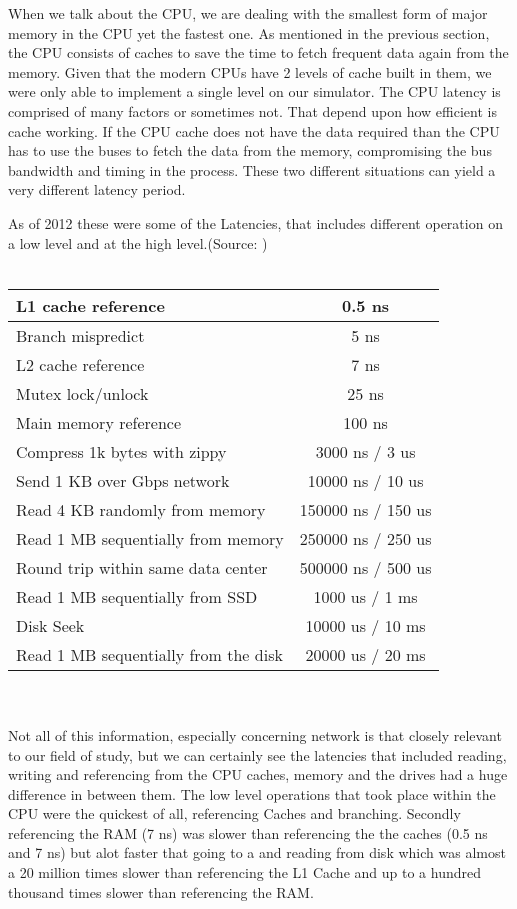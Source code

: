 \documentclass[12pt]{article}
\begin{document}
When we talk about the CPU, we are dealing with the smallest form of major memory in the CPU yet the fastest one.
As mentioned in the previous section, the CPU consists of caches to save the time to fetch frequent data
again from the memory. Given that the modern CPUs have 2 levels of cache built in them, we were only able to
implement a single level on our simulator. The CPU latency is comprised of many factors or sometimes not. That
depend upon how efficient is cache working. If the CPU cache does not have the data required than the CPU has
to use the buses to fetch the data from the memory, compromising the bus bandwidth and timing in the process.
These two different situations can yield a very different latency period.

As of 2012 these were some of the Latencies, that includes different operation on a low level
and at the high level.(Source: \cite {Latencies})
\\\\
\begin{tabular}{|l|c|}
  \hline
  L1 cache reference & 0.5 ns\\
  \hline
  Branch mispredict & 5 ns\\
  \hline
  L2 cache reference & 7 ns\\
  \hline
  Mutex lock/unlock & 25 ns\\
  \hline
  Main memory reference & 100 ns\\
  \hline
  Compress 1k bytes with zippy & 3000 ns / 3 us\\
  \hline
  Send 1 KB over Gbps network & 10000 ns / 10 us\\
  \hline
  Read 4 KB randomly from memory & 150000 ns / 150 us\\
  \hline
  Read 1 MB sequentially from memory & 250000 ns / 250 us\\
  \hline
  Round trip within same data center & 500000 ns / 500 us\\
  \hline
  Read 1 MB sequentially from SSD & 1000 us / 1 ms\\
  \hline
  Disk Seek & 10000 us / 10 ms\\
  \hline
  Read 1 MB sequentially from the disk & 20000 us / 20 ms\\ 
  \hline    
\end {tabular}
\\\\
Not all of this information, especially concerning network is that closely relevant to our field of study, but
we can certainly see the latencies that included reading, writing and referencing from the CPU caches, memory
and the drives had a huge difference in between them. The low level operations that took place within the
CPU were the quickest of all, referencing Caches and branching. Secondly referencing the RAM (7 ns) was slower than
referencing the the caches (0.5 ns and 7 ns) but alot faster that going to a and reading from disk which was almost a
20 million times slower than referencing the L1 Cache and up to a hundred thousand times slower than referencing
the RAM. 
\end{document}
